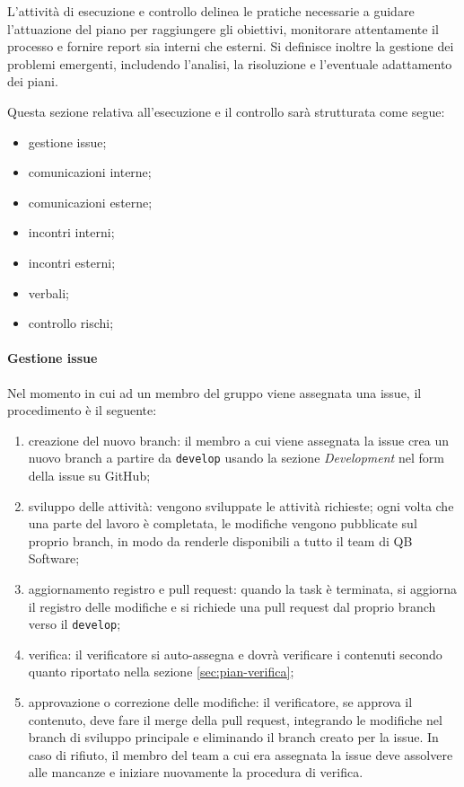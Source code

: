     L'attività di esecuzione e controllo delinea le pratiche necessarie a guidare l'attuazione del piano per raggiungere gli obiettivi, monitorare attentamente il processo e fornire report sia interni che esterni. Si definisce inoltre la gestione dei problemi emergenti,  includendo l'analisi, la risoluzione e l'eventuale adattamento dei piani.
    
    \noindent 
    Questa sezione relativa all'esecuzione e il controllo sarà strutturata come segue:
    \begin{itemize}
        \item gestione issue;
        \item comunicazioni interne;
        \item comunicazioni esterne;
        \item incontri interni;
        \item incontri esterni;
        \item verbali;
        \item controllo rischi;
    \end{itemize}

    \paragraph{Gestione issue}
    Nel momento in cui ad un membro del gruppo viene assegnata una issue, il procedimento è il seguente:

    \begin{enumerate}
        \item creazione del nuovo branch: il membro a cui viene assegnata la issue crea un nuovo branch a partire da \verb|develop| usando la sezione \emph{Development} nel form della issue su GitHub;
        \item sviluppo delle attività: vengono sviluppate le attività richieste; ogni volta che una parte del lavoro è completata, le modifiche vengono pubblicate sul proprio branch, in modo da renderle disponibili a tutto il team di QB Software;
        \item aggiornamento registro e pull request: quando la task è terminata, si aggiorna il registro delle modifiche e si richiede una pull request dal proprio branch verso il \verb|develop|;
        \item verifica: il verificatore si auto-assegna e dovrà verificare i contenuti secondo quanto riportato nella sezione \ref{sec:pian-verifica};
        \item approvazione o correzione delle modifiche: il verificatore, se approva il contenuto, deve fare il merge della pull request, integrando le modifiche nel branch di sviluppo principale e eliminando il branch creato per la issue. In caso di rifiuto, il membro del team a cui era assegnata la issue deve assolvere alle mancanze e iniziare nuovamente la procedura di verifica.
    \end{enumerate}



